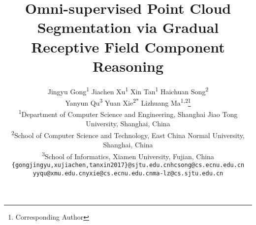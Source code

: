 \documentclass[final]{cvpr}
\begin{document}
\title{Omni-supervised Point Cloud Segmentation via Gradual Receptive Field Component Reasoning}

\iffalse
\author{First Author\\
Institution1\\
Institution1 address\\
{\tt\small firstauthor@i1.org}
\and
Second Author\\
Institution2\\
First line of institution2 address\\
{\tt\small secondauthor@i2.org}
}
\fi
\author{
Jingyu Gong\textsuperscript{\rm 1}\;\quad
Jiachen Xu\textsuperscript{\rm 1}\;\quad
Xin Tan\textsuperscript{\rm 1}\;\quad
Haichuan Song\textsuperscript{\rm 2}\;\quad\\
Yanyun Qu\textsuperscript{\rm 3}\;\quad
Yuan Xie\textsuperscript{\rm 2$*$}\;\quad
Lizhuang Ma\textsuperscript{\rm 1,2}\thanks{Corresponding Author}\\
\textsuperscript{\rm 1}Department of Computer Science and Engineering, Shanghai Jiao Tong University, Shanghai, China\\
\textsuperscript{\rm 2}School of Computer Science and Technology, East China Normal University, Shanghai, China\\
\textsuperscript{\rm 3}School of Informatics, Xiamen University, Fujian, China\\
{\tt\small \{gongjingyu,xujiachen,tanxin2017\}@sjtu.edu.cn\;\quad  hcsong@cs.ecnu.edu.cn}\\
{\tt\small yyqu@xmu.edu.cn\;\quad yxie@cs.ecnu.edu.cn\;\quad ma-lz@cs.sjtu.edu.cn}
}

\maketitle
\end{document}
